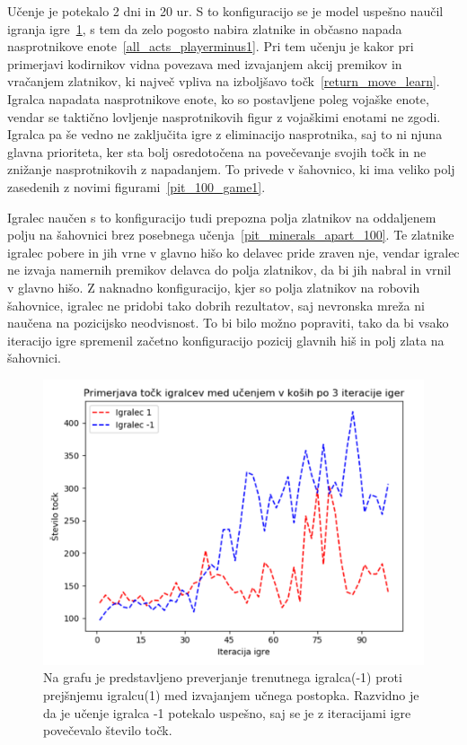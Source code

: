 \documentclass[a4paper, 12pt]{book}
\begin{document}
Učenje je potekalo 2 dni in 20 ur.
S to konfiguracijo se je model uspešno naučil igranja igre~\ref{learn_plot}, s tem da zelo pogosto nabira zlatnike in občasno napada nasprotnikove enote~\ref{all_acts_playerminus1}.
Pri tem učenju je kakor pri primerjavi kodirnikov vidna povezava med izvajanjem akcij premikov in vračanjem zlatnikov, ki največ vpliva na izboljšavo točk~\ref{return_move_learn}.
Igralca napadata nasprotnikove enote, ko so postavljene poleg vojaške enote, vendar se taktično lovljenje nasprotnikovih figur z vojaškimi enotami ne zgodi.
Igralca pa še vedno ne zaključita igre z eliminacijo nasprotnika, saj to ni njuna glavna prioriteta, ker sta bolj osredotočena na povečevanje svojih točk in ne znižanje nasprotnikovih z napadanjem.
To privede v šahovnico, ki ima veliko polj zasedenih z novimi figurami~\ref{pit_100_game1}.

Igralec naučen s to konfiguracijo tudi prepozna polja zlatnikov na oddaljenem polju na šahovnici brez posebnega učenja~\ref{pit_minerals_apart_100}.
Te zlatnike igralec pobere in jih vrne v glavno hišo ko delavec pride zraven nje, vendar igralec ne izvaja namernih premikov delavca do polja zlatnikov, da bi jih nabral in vrnil v glavno hišo.
Z naknadno konfiguracijo, kjer so polja zlatnikov na robovih šahovnice, igralec ne pridobi tako dobrih rezultatov, saj nevronska mreža ni naučena na pozicijsko neodvisnost.
To bi bilo možno popraviti, tako da bi vsako iteracijo igre spremenil začetno konfiguracijo pozicij glavnih hiš in polj zlata na šahovnici.

\begin{figure}[h]
	\begin{center}
		\includegraphics[width=1\textwidth]{photos/learn_plot.pdf}
	\end{center}
	\caption{Na grafu je predstavljeno preverjanje trenutnega igralca(-1) proti prejšnjemu igralcu(1) med izvajanjem učnega postopka.
	Razvidno je da je učenje igralca -1 potekalo uspešno, saj se je z iteracijami igre povečevalo število točk.}
	\label{learn_plot}
\end{figure}
\end{document}
